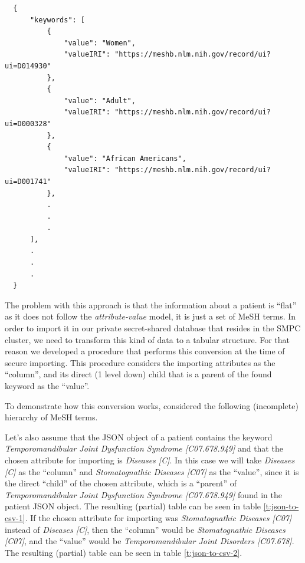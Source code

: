 {
\begin{verbatim}
  {
      "keywords": [
          {
              "value": "Women",
              "valueIRI": "https://meshb.nlm.nih.gov/record/ui?ui=D014930"
          },
          {
              "value": "Adult",
              "valueIRI": "https://meshb.nlm.nih.gov/record/ui?ui=D000328"
          },
          {
              "value": "African Americans",
              "valueIRI": "https://meshb.nlm.nih.gov/record/ui?ui=D001741"
          },
          .
          .
          .
      ],
      .
      .
      .
  }
\end{verbatim}
\label{sc:mesh-json}
}

The problem with this approach is that the information about a patient is ``flat'' as it does not follow the \textit{attribute\hyp value} model, it is just a set of MeSH terms.
In order to import it in our private secret\hyp shared database that resides in the SMPC cluster, we need to transform this kind of data to a tabular structure.
For that reason we developed a procedure that performs this conversion at the time of secure importing.
This procedure considers the importing attributes as the ``column'', and its direct (1 level down) child that is a parent of the found keyword as the ``value''.

To demonstrate how this conversion works, considered the following (incomplete) hierarchy of MeSH terms.

Let's also assume that the JSON object of a patient contains the keyword \textit{Temporomandibular Joint Dysfunction Syndrome [C07.678.949]} and that the chosen attribute for importing is \textit{Diseases [C]}.
In this case we will take \textit{Diseases [C]} as the ``column'' and \textit{Stomatognathic Diseases [C07]} as the ``value'', since it is the direct ``child'' of the chosen attribute, which is a ``parent'' of \textit{Temporomandibular Joint Dysfunction Syndrome [C07.678.949]} found in the patient JSON object. The resulting (partial) table can be seen in table \ref{t:json-to-csv-1}.
If the chosen attribute for importing was \textit{Stomatognathic Diseases [C07]} instead of \textit{Diseases [C]}, then the ``column'' would be \textit{Stomatognathic Diseases [C07]}, and the ``value'' would be \textit{Temporomandibular Joint Disorders [C07.678]}. The resulting (partial) table can be seen in table \ref{t:json-to-csv-2}.

